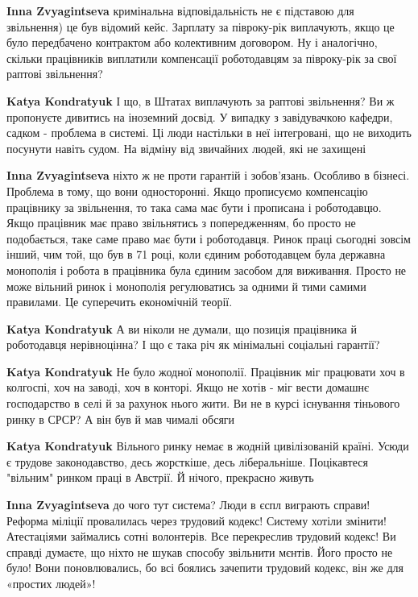 \begin{itemize}
\begin{itemize}
\textbf{Inna Zvyagintseva} кримінальна відповідальність не є підставою для звільнення) це був відомий кейс. Зарплату за півроку-рік виплачують, якщо це було передбачено контрактом або колективним договором.
Ну і аналогічно, скільки працівників виплатили компенсації роботодавцям за півроку-рік за свої раптові звільнення?

\textbf{Katya Kondratyuk} І що, в Штатах виплачують за раптові звільнення? Ви ж пропонуєте дивитись на іноземний досвід. У випадку з завідувачкою кафедри, садком - проблема в системі. Ці люди настільки в неї інтегровані, що не виходить посунути навіть судом. На відміну від звичайних людей, які не захищені

\textbf{Inna Zvyagintseva} ніхто ж не проти гарантій і зобов’язань. Особливо в бізнесі. Проблема в тому, що вони односторонні. Якщо прописуємо компенсацію працівнику за звільнення, то така сама має бути і прописана і роботодавцю. Якщо працівник має право звільнятись з попередженням, бо просто не подобається, таке саме право має бути і роботодавця. Ринок праці сьогодні зовсім інший, чим той, що був в 71 році, коли єдиним роботодавцем була державна монополія і робота в працівника була єдиним засобом для виживання. Просто не може вільний ринок і монополія регулюватись за одними й тими самими правилами. Це суперечить економічній теорії.

\textbf{Katya Kondratyuk} А ви ніколи не думали, що позиція працівника й роботодавця нерівноцінна? І що є така річ як мінімальні соціальні гарантії?

\textbf{Katya Kondratyuk} Не було жодної монополії. Працівник міг працювати хоч в колгоспі, хоч на заводі, хоч в конторі. Якщо не хотів - міг вести домашнє господарство в селі й за рахунок нього жити. Ви не в курсі існування тіньового ринку в СРСР? А він був й мав чималі обсяги

\textbf{Katya Kondratyuk} Вільного ринку немає в жодній цивілізованій країні. Усюди є трудове законодавство, десь жорсткіше, десь ліберальніше. Поцікавтеся "вільним" ринком праці в Австрії. Й нічого, прекрасно живуть

\textbf{Inna Zvyagintseva} до чого тут система? Люди в єспл виграють справи! Реформа міліції провалилась через трудовий кодекс! Систему хотіли змінити! Атестаціями займались сотні волонтерів. Все перекреслив трудовий кодекс! Ви справді думаєте, що ніхто не шукав способу звільнити мєнтів. Його просто не було! Вони поновлювались, бо всі боялись зачепити трудовий кодекс, він же для «простих людей»!


\end{itemize}
\end{itemize}
